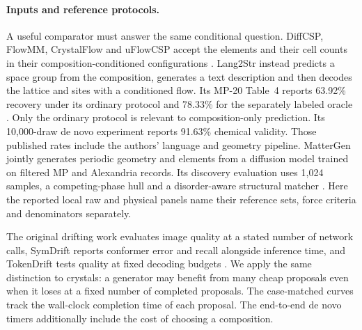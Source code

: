 \paragraph{Inputs and reference protocols.}
A useful comparator must answer the same conditional question. DiffCSP, FlowMM, CrystalFlow and uFlowCSP accept the elements and their cell counts in their composition-conditioned configurations \cite{diffcsp,flowmm,crystalflow,uflow}. Lang2Str instead predicts a space group from the composition, generates a text description and then decodes the lattice and sites with a conditioned flow. Its MP-20 Table~4 reports 63.92\% recovery under its ordinary protocol and 78.33\% for the separately labeled oracle \cite{lang2str}. Only the ordinary protocol is relevant to composition-only prediction. Its 10,000-draw de novo experiment reports 91.63\% chemical validity. Those published rates include the authors' language and geometry pipeline. MatterGen jointly generates periodic geometry and elements from a diffusion model trained on filtered MP and Alexandria records. Its discovery evaluation uses 1,024 samples, a competing-phase hull and a disorder-aware structural matcher \cite{mattergen}. Here the reported local raw and physical panels name their reference sets, force criteria and denominators separately.

The original drifting work evaluates image quality at a stated number of network calls, SymDrift reports conformer error and recall alongside inference time, and TokenDrift tests quality at fixed decoding budgets \cite{deng,symdrift,tokendrift}. We apply the same distinction to crystals: a generator may benefit from many cheap proposals even when it loses at a fixed number of completed proposals. The case-matched curves track the wall-clock completion time of each proposal. The end-to-end de novo timers additionally include the cost of choosing a composition.
